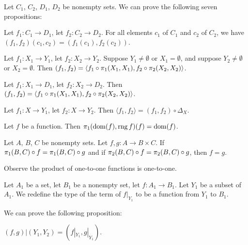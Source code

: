\documentclass{article}
\begin{document}
Let $C_{1}$, $C_{2}$, $D_{1}$, $D_{2}$ be nonempty sets.
We can prove the following seven propositions:
\begin{thm}
\item\label{funct3:75} Let $f_{1}\colon C_{1}\to D_{1}$,
  let $f_{2}\colon C_{2}\to D_{2}$. For all elements $c_{1}$ of $C_{1}$
  and $c_{2}$ of $C_{2}$, we have $(f_{1},f_{2})(c_{1},c_{2})=(f_{1}(c_{1}),f_{2}(c_{2}))$.
\item\label{funct3:76} Let $f_{1}\colon X_{1}\to Y_{1}$,
  let $f_{2}\colon X_{2}\to Y_{2}$.
  Suppose $Y_{1}\neq\emptyset$ or $X_{1}=\emptyset$, and suppose
  $Y_{2}\neq\emptyset$ or $X_{2}=\emptyset$.
  Then $(f_{1},f_{2})=\langle f_{1}\circ\pi_{1}(X_{1}, X_{1}), f_{2}\circ\pi_{2}(X_{2}, X_{2})\rangle$.
\item\label{funct3:77} Let $f_{1}\colon X_{1}\to D_{1}$,
  let $f_{2}\colon X_{2}\to D_{2}$.
  Then $(f_{1},f_{2})=\langle f_{1}\circ\pi_{1}(X_{1}, X_{1}), f_{2}\circ\pi_{2}(X_{2}, X_{2})\rangle$.
\item\label{funct3:78} Let $f_{1}\colon X\to Y_{1}$, let $f_{2}\colon X\to Y_{2}$.
  Then $\langle f_{1},f_{2}\rangle = (f_{1},f_{2})\circ\Delta_{X}$.
\item\label{funct3:79} Let $f$ be a function.
  Then $\pi_{1}(\operatorname{dom}(f), \operatorname{rng}{f})(f)=\operatorname{dom}(f)$.
\item\label{funct3:80} Let $A$, $B$, $C$ be nonempty sets.
  Let $f,g\colon A\to B\times C$.
  If $\pi_{1}(B, C)\circ f=\pi_{1}(B, C)\circ g$
  and if $\pi_{2}(B, C)\circ f=\pi_{2}(B, C)\circ g$,
  then $f=g$.
\end{thm}
Observe the product of one-to-one functions is one-to-one.

\begin{definition}
  Let $A_{1}$ be a set, let $B_{1}$ be a nonempty set,
  let $f\colon A_{1}\to B_{1}$. Let $Y_{1}$ be a subset of $A_{1}$.
  We redefine the type of the term of $f|_{Y_{1}}$ to be a function from
  $Y_{1}$ to $B_{1}$.
\end{definition}

We can prove the following proposition:
\begin{thm}
\item\label{funct3:81} $(f,g)|(Y_{1},Y_{2})=(f|_{Y_{1}},g|_{Y_{1}})$.
\end{thm}
\end{document}
